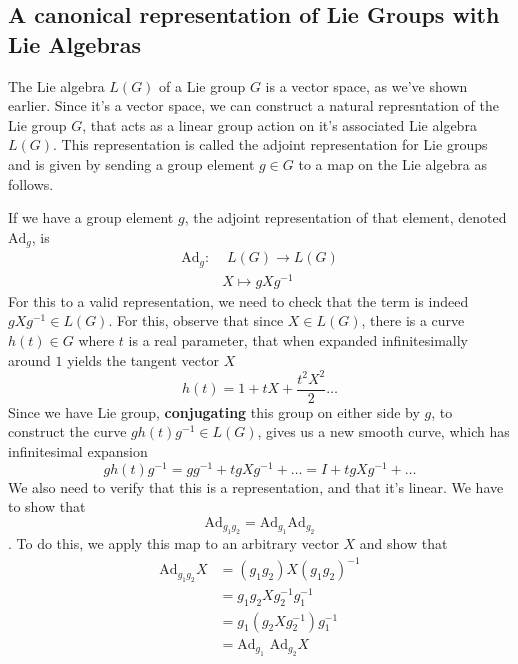 \subsection{A canonical representation of Lie Groups with Lie Algebras}
The Lie algebra $L( G )$ of a Lie group $G $ is a vector space, as we've shown earlier. Since it's a vector space, we can construct a natural represntation of the Lie group $G $, that acts as a linear group action on it's associated Lie algebra $L( G )$. This representation is called the adjoint representation for Lie groups and is given by sending a group element $g \in G$ to a map on the Lie algebra as follows. 

If we have a group element $g$, the adjoint representation of that element, denoted $\text{Ad}_g$, is 
\begin{align*} 
\text{Ad}_g :&  \, \, L(G) \rightarrow L(G)  \\ 
& X \mapsto g X g^ { -1 }  
\end{align*} 
For this to a valid representation, we need to check that the term is indeed $gXg^{-1} \in L(G)$. For this, observe that since $X \in L(G)$, there is a curve $h(t) \in G$ where $t$ is a real parameter, that when expanded infinitesimally around $1$ yields the tangent vector $X$ \[ h(t) = 1 + tX + \frac{ t^2 X^2}{ 2} \dots \] 
Since we have Lie group, \textbf{conjugating} this group on either side by $g$, to construct the curve $g  h(t) g^ { -1}  \in L(G) $, gives us a new smooth curve, which has infinitesimal expansion \[ g h(t) g^{-1}  = g g^{-1}  + t g X g^ {-1}  + \dots = I + t g X g^ {-1}  + \dots \]
We also need to verify that this is a representation, and that it's linear. We have to show that \[ \text{Ad}_{g_1 g_2} = \text{Ad}_{ g_1} \text{Ad} _{g_ 2} \]. To do this, we apply this map to an arbitrary vector $X$ and show that
\begin{align*} 
\text{Ad}_{g_1 g_2} X & = (g_1 g_2) X (g_1 g_2)^ { -1} \\
	& = g_1 g_2 X g_2^{-1} g_1^{-1} \\ 
	& = g_1 ( g_2 X g_2^{-1} ) g_1^{-1} \\ 
	& = \text{Ad}_{g_1} \text{ Ad} _{g_2} X 
\end{align*}  

